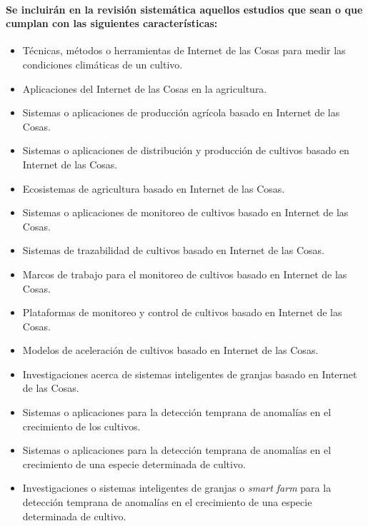 \documentclass[10pt, twocolumn]{article}
\begin{document}
\paragraph{Se incluirán en la revisión sistemática aquellos estudios que sean o que cumplan con las siguientes características:}
\begin{itemize}
	\item{Técnicas, métodos o herramientas de Internet de las Cosas para medir las condiciones climáticas de un cultivo.}
	\item{Aplicaciones del Internet de las Cosas en la agricultura.}
	\item{Sistemas o aplicaciones de producción agrícola basado en Internet de las Cosas.}
	\item{Sistemas o aplicaciones de distribución y producción de cultivos basado en Internet de las Cosas.}
	\item{Ecosistemas de agricultura basado en Internet de las Cosas.}
	\item{Sistemas o aplicaciones de monitoreo de cultivos basado en Internet de las Cosas.}
	\item{Sistemas de trazabilidad de cultivos basado en Internet de las Cosas.}
	\item{Marcos de trabajo para el monitoreo de cultivos basado en Internet de las Cosas.}
	\item{Plataformas de monitoreo y control de cultivos basado en Internet de las Cosas.}
	\item{Modelos de aceleración de cultivos basado en Internet de las Cosas.}	
	\item{Investigaciones acerca de sistemas inteligentes de granjas basado en Internet de las Cosas.}
	\item{Sistemas o aplicaciones para la detección temprana de anomalías en el crecimiento de los cultivos.}
	\item{Sistemas o aplicaciones para la detección temprana de anomalías en el crecimiento de una especie determinada de cultivo.}
	\item{Investigaciones o sistemas inteligentes de granjas o \textit{smart farm} para la detección temprana de anomalías en el crecimiento de una especie determinada de cultivo.}
\end{itemize}
\end{document}
